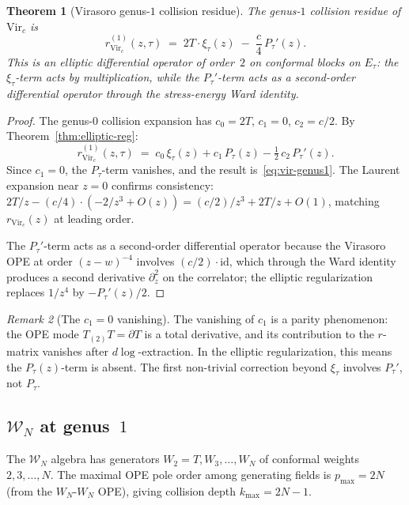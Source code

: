 \documentclass[11pt]{article}
\theoremstyle{plain}
\newtheorem{theorem}{Theorem}[section]
\theoremstyle{definition}
\theoremstyle{remark}
\newtheorem{remark}[theorem]{Remark}
\newcommand{\cW}{\mathcal{W}}
\newcommand{\Vir}{\mathrm{Vir}}
\numberwithin{equation}{section}
\begin{document}
\begin{theorem}[Virasoro genus-$1$ collision
residue]\label{thm:virasoro-g1}
The genus-$1$ collision residue of $\Vir_c$ is
\begin{equation}\label{eq:vir-genus1}
r_{\Vir_c}^{(1)}(z,\tau)
\;=\;
2T\cdot\xi_\tau(z) \;-\; \frac{c}{4}\,P_\tau'(z).
\end{equation}
This is an elliptic differential operator of order~$2$ on conformal
blocks on $E_\tau$: the \(\xi_\tau\)-term acts by multiplication,
while the \(P_\tau'\)-term acts as a second-order differential operator
through the stress-energy Ward identity.
\end{theorem}

\begin{proof}
The genus-$0$ collision expansion has $c_0 = 2T$, $c_1 = 0$,
$c_2 = c/2$. By Theorem~\ref{thm:elliptic-reg}:
\[
r_{\Vir_c}^{(1)}(z,\tau)
\;=\;
c_0\,\xi_\tau(z) + c_1\,P_\tau(z)
- \tfrac{1}{2}\,c_2\,P_\tau'(z).
\]
Since $c_1 = 0$, the \(P_\tau\)-term vanishes, and the result
is~\eqref{eq:vir-genus1}. The Laurent expansion near $z = 0$
confirms consistency: $2T/z - (c/4)\cdot(-2/z^3 + O(z))
= (c/2)/z^3 + 2T/z + O(1)$, matching $r_{\Vir_c}(z)$ at leading
order.

The \(P_\tau'\)-term acts as a second-order differential operator because
the Virasoro OPE at order $(z-w)^{-4}$ involves
$(c/2)\cdot\mathrm{id}$, which through the Ward identity produces a
second derivative $\partial_z^2$ on the correlator; the elliptic
regularization replaces $1/z^4$ by $-P_\tau'(z)/2$.
\end{proof}

\begin{remark}[The $c_1 = 0$ vanishing]\label{rem:c1-vanishing}
The vanishing of $c_1$ is a parity phenomenon: the OPE mode
$T_{(2)}T = \partial T$ is a total derivative, and its contribution to
the $r$-matrix vanishes after $d\log$-extraction. In the elliptic
regularization, this means the \(P_\tau(z)\)-term is absent. The
first non-trivial correction beyond \(\xi_\tau\) involves \(P_\tau'\),
not \(P_\tau\).
\end{remark}


\subsection{$\cW_N$ at genus~$1$}

The $\cW_N$ algebra has generators $W_2 = T, W_3, \ldots, W_N$ of
conformal weights $2,3,\ldots,N$. The maximal OPE pole order among
generating fields is $p_{\max} = 2N$ (from the $W_N$-$W_N$ OPE),
giving collision depth $k_{\max} = 2N-1$.
\end{document}
